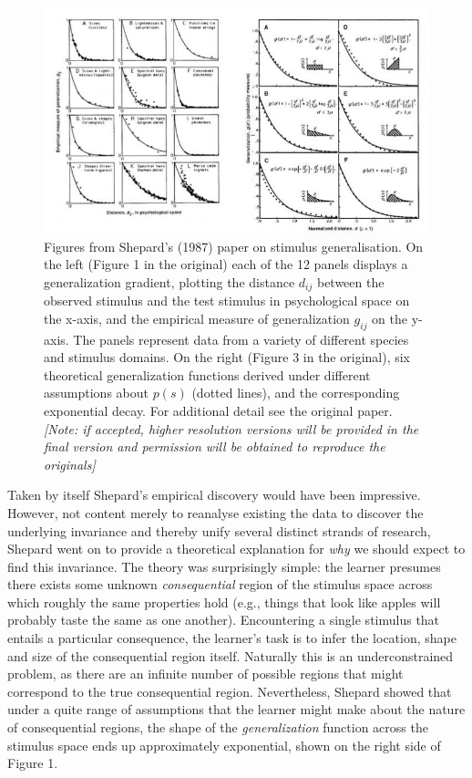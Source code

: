\documentclass[english,doc]{apa6}
\begin{document}
\begin{figure}[t]
\includegraphics[width=5.8in]{shepard} \caption{Figures from Shepard's (1987) paper on stimulus generalisation. On the left (Figure 1 in the original) each of the 12 panels displays a generalization gradient, plotting the distance \(d_{ij}\) between the observed stimulus and the test stimulus in psychological space on the x-axis, and the empirical measure of generalization \(g_{ij}\) on the y-axis. The panels represent data from a variety of different species and stimulus domains. On the right (Figure 3 in the original), six theoretical generalization functions derived under different assumptions about \(p(s)\) (dotted lines), and the corresponding exponential decay. For additional detail see the original paper. \emph{{[}Note: if accepted, higher resolution versions will be provided in the final version and permission will be obtained to reproduce the originals{]}}}\label{fig:unnamed-chunk-1}
\end{figure}

Taken by itself Shepard's empirical discovery would have been impressive. However, not content merely to reanalyse existing the data to discover the underlying invariance and thereby unify several distinct strands of research, Shepard went on to provide a theoretical explanation for \emph{why} we should expect to find this invariance. The theory was surprisingly simple: the learner presumes there exists some unknown \emph{consequential} region of the stimulus space across which roughly the same properties hold (e.g., things that look like apples will probably taste the same as one another). Encountering a single stimulus that entails a particular consequence, the learner's task is to infer the location, shape and size of the consequential region itself. Naturally this is an underconstrained problem, as there are an infinite number of possible regions that might correspond to the true consequential region. Nevertheless, Shepard showed that under a quite range of assumptions that the learner might make about the nature of consequential regions, the shape of the \emph{generalization} function across the stimulus space ends up approximately exponential, shown on the right side of Figure 1.
\end{document}
